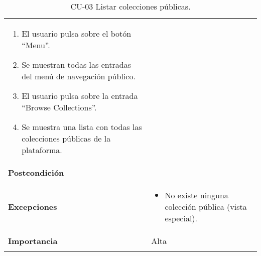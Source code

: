 \begin{longtable}[]{@{}ll@{}}
\begin{minipage}[t]{0.72\columnwidth}
\begin{enumerate}
\def\labelenumi{\arabic{enumi}.}
\tightlist
\item
  El usuario pulsa sobre el botón ``Menu''.
\item
  Se muestran todas las entradas del menú de navegación público.
\item
  El usuario pulsa sobre la entrada ``Browse Collections''.
\item
  Se muestra una lista con todas las colecciones públicas de la
  plataforma.
\end{enumerate}\strut
\end{minipage}\tabularnewline
\begin{minipage}[t]{0.22\columnwidth}\raggedright
\textbf{Postcondición}\strut
\end{minipage} & \begin{minipage}[t]{0.72\columnwidth}\raggedright
\strut
\end{minipage}\tabularnewline
\begin{minipage}[t]{0.22\columnwidth}\raggedright
\textbf{Excepciones}\strut
\end{minipage} & \begin{minipage}[t]{0.72\columnwidth}\raggedright
\begin{itemize}
\tightlist
\item
  No existe ninguna colección pública (vista especial).
\end{itemize}\strut
\end{minipage}\tabularnewline
\begin{minipage}[t]{0.22\columnwidth}\raggedright
\textbf{Importancia}\strut
\end{minipage} & \begin{minipage}[t]{0.72\columnwidth}\raggedright
Alta\strut
\end{minipage}\tabularnewline
\bottomrule
\caption{CU-03 Listar colecciones públicas.}
\end{longtable}

